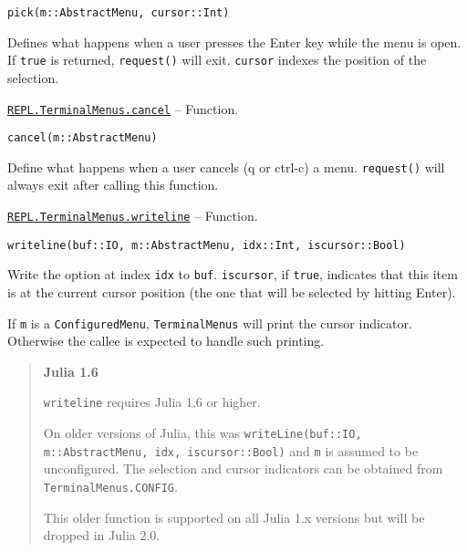 \begin{adjustwidth}{2em}{0pt}


\begin{verbatim}
pick(m::AbstractMenu, cursor::Int)
\end{verbatim}

Defines what happens when a user presses the Enter key while the menu is open. If \texttt{true} is returned, \texttt{request()} will exit. \texttt{cursor} indexes the position of the selection.



\end{adjustwidth}
\hypertarget{484478950208933809}{}
\hyperlink{484478950208933809}{\texttt{REPL.TerminalMenus.cancel}}  -- {Function.}

\begin{adjustwidth}{2em}{0pt}


\begin{verbatim}
cancel(m::AbstractMenu)
\end{verbatim}

Define what happens when a user cancels ({\textquotesingle}q{\textquotesingle} or ctrl-c) a menu. \texttt{request()} will always exit after calling this function.



\end{adjustwidth}
\hypertarget{13474797786091440413}{}
\hyperlink{13474797786091440413}{\texttt{REPL.TerminalMenus.writeline}}  -- {Function.}

\begin{adjustwidth}{2em}{0pt}


\begin{verbatim}
writeline(buf::IO, m::AbstractMenu, idx::Int, iscursor::Bool)
\end{verbatim}

Write the option at index \texttt{idx} to \texttt{buf}. \texttt{iscursor}, if \texttt{true}, indicates that this item is at the current cursor position (the one that will be selected by hitting {\textquotedbl}Enter{\textquotedbl}).

If \texttt{m} is a \texttt{ConfiguredMenu}, \texttt{TerminalMenus} will print the cursor indicator. Otherwise the callee is expected to handle such printing.

\begin{quote}
\textbf{Julia 1.6}

\texttt{writeline} requires Julia 1.6 or higher.

On older versions of Julia, this was     \texttt{writeLine(buf::IO, m::AbstractMenu, idx, iscursor::Bool)} and \texttt{m} is assumed to be unconfigured. The selection and cursor indicators can be obtained from \texttt{TerminalMenus.CONFIG}.

This older function is supported on all Julia 1.x versions but will be dropped in Julia 2.0.

\end{quote}


\end{adjustwidth}

